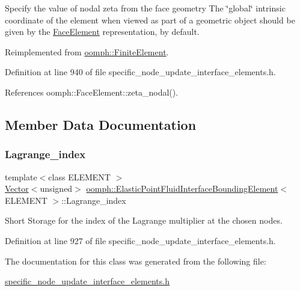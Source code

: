 Specify the value of nodal zeta from the face geometry The \char`\"{}global\char`\"{} intrinsic coordinate of the element when viewed as part of a geometric object should be given by the \hyperlink{classoomph_1_1FaceElement}{Face\+Element} representation, by default. 



Reimplemented from \hyperlink{classoomph_1_1FiniteElement_a849561c5fbcbc07dc49d2dc6cca68559}{oomph\+::\+Finite\+Element}.



Definition at line 940 of file specific\+\_\+node\+\_\+update\+\_\+interface\+\_\+elements.\+h.



References oomph\+::\+Face\+Element\+::zeta\+\_\+nodal().



\subsection{Member Data Documentation}
\mbox{\label{classoomph_1_1ElasticPointFluidInterfaceBoundingElement_a6ba345f9959aa12708c3ef8598327bc2}} 
\subsubsection{\texorpdfstring{Lagrange\+\_\+index}{Lagrange\_index}}
{\footnotesize\ttfamily template$<$class E\+L\+E\+M\+E\+NT $>$ \\
\hyperlink{classoomph_1_1Vector}{Vector}$<$unsigned$>$ \hyperlink{classoomph_1_1ElasticPointFluidInterfaceBoundingElement}{oomph\+::\+Elastic\+Point\+Fluid\+Interface\+Bounding\+Element}$<$ E\+L\+E\+M\+E\+NT $>$\+::Lagrange\+\_\+index\hspace{0.3cm}{\ttfamily [private]}}



Short Storage for the index of the Lagrange multiplier at the chosen nodes. 



Definition at line 927 of file specific\+\_\+node\+\_\+update\+\_\+interface\+\_\+elements.\+h.



The documentation for this class was generated from the following file\+:\begin{DoxyCompactItemize}
\item 
\hyperlink{specific__node__update__interface__elements_8h}{specific\+\_\+node\+\_\+update\+\_\+interface\+\_\+elements.\+h}\end{DoxyCompactItemize}
